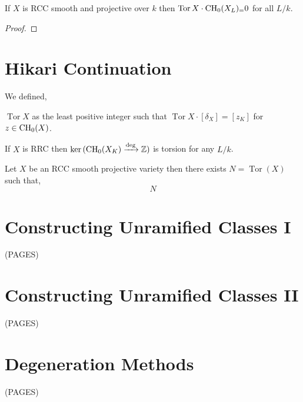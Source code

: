 \documentclass[12pt]{article}
\DeclareMathOperator{\torsion}{\mathrm{Tor}}
\begin{document}
\begin{prop}
If $X$ is RCC smooth and projective over $k$ then $\torsion{X} \cdot \CH_0(X_L)_ = 0$ for all $L / k$.
\end{prop}

\begin{proof}

\end{proof}

\section{Hikari Continuation}

We defined,

\begin{defn}
$\torsion{X}$ as the least positive integer such that $\torsion{X} \cdot [\delta_X] = [z_K]$ for $z \in \mathrm{CH}_0(X)$.
\end{defn}

\begin{lemma}
If $X$ is RRC then $\ker{(\mathrm{CH}_0(X_K) \xrightarrow{\deg} \mathbb{Z})}$ is torsion for any $L/k$.
\end{lemma}

\begin{prop}
Let $X$ be an RCC smooth projective variety then there exists $N = \torsion(X)$ such that,
\[ N \]
\end{prop}


\section{Constructing Unramified Classes I}

(PAGES)

\section{Constructing Unramified Classes II}

(PAGES)

\section{Degeneration Methods}

(PAGES)
\end{document}
